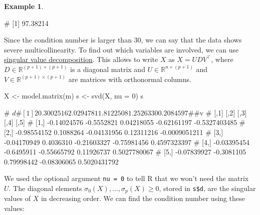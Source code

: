 \documentclass[
  a4paper,
]{article}
\newenvironment{Shaded}{\begin{snugshade}}{\end{snugshade}}
\newcommand{\AttributeTok}[1]{\textcolor[rgb]{0.77,0.63,0.00}{#1}}
\newcommand{\DecValTok}[1]{\textcolor[rgb]{0.00,0.00,0.81}{#1}}
\newcommand{\FunctionTok}[1]{\textcolor[rgb]{0.00,0.00,0.00}{#1}}
\newcommand{\NormalTok}[1]{#1}
\newcommand{\OtherTok}[1]{\textcolor[rgb]{0.56,0.35,0.01}{#1}}
\newcommand{\SpecialCharTok}[1]{\textcolor[rgb]{0.00,0.00,0.00}{#1}}
\theoremstyle{definition}
\theoremstyle{definition}
\newtheorem{example}{Example}[section]
\theoremstyle{definition}
\theoremstyle{definition}
\theoremstyle{remark}
\begin{document}
\begin{example}
\begin{Shaded}
\begin{Highlighting}[]
\NormalTok{\# [1] 97.38214}
\end{Highlighting}
\end{Shaded}

Since the condition number is larger than 30, we can say that the
data shows severe multicollinearity. To find out which variables
are involved, we can use \href{https://en.wikipedia.org/wiki/Singular_value_decomposition}{singular value decomposition}.
This allows to write \(X\) as \(X = U D V^\top\), where \(D\in\mathbb{R}^{(p+1)\times(p+1)}\)
is a diagonal matrix and \(U\in\mathbb{R}^{n\times(p+1)}\) and
\(V\in\mathbb{R}^{(p+1)\times(p+1)}\) are matrices with orthonormal columns.

\begin{Shaded}
\begin{Highlighting}[]
\NormalTok{X }\OtherTok{\textless{}{-}} \FunctionTok{model.matrix}\NormalTok{(m)}
\NormalTok{s }\OtherTok{\textless{}{-}} \FunctionTok{svd}\NormalTok{(X, }\AttributeTok{nu =} \DecValTok{0}\NormalTok{)}
\NormalTok{s}
\end{Highlighting}
\end{Shaded}

\begin{Shaded}
\begin{Highlighting}[]
\NormalTok{\# $d}
\NormalTok{\# [1] 20.3002516  2.0294781  1.8122508  1.2526330  0.2084597}
\NormalTok{\# }
\NormalTok{\# $v}
\NormalTok{\#             [,1]       [,2]        [,3]        [,4]          [,5]}
\NormalTok{\# [1,] {-}0.14024576 {-}0.5552821  0.04218055 {-}0.62161197 {-}0.5327403485}
\NormalTok{\# [2,] {-}0.98554152  0.1088264 {-}0.04131956  0.12311216 {-}0.0009051211}
\NormalTok{\# [3,] {-}0.04170949  0.4036310 {-}0.21603327 {-}0.75981456  0.4597323397}
\NormalTok{\# [4,] {-}0.03395454 {-}0.6495911 {-}0.55665792  0.11926737  0.5027780067}
\NormalTok{\# [5,] {-}0.07839927 {-}0.3081105  0.79998442 {-}0.08306065  0.5020431792}
\end{Highlighting}
\end{Shaded}

We used the optional argument \texttt{nu\ =\ 0} to tell R that we won't need the
matrix~\(U\). The diagonal elements \(\sigma_0(X), \ldots, \sigma_{p}(X) \geq 0\),
stored in \texttt{s\$d}, are the singular values of \(X\) in decreasing order.
We can find the condition number using these values:

\begin{Shaded}
\end{Shaded}


\end{example}
\end{document}
